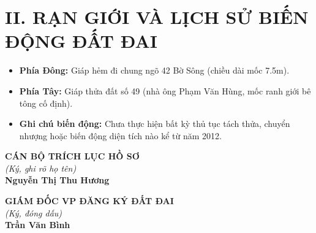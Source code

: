 \documentclass[12pt,a4paper]{article}
\begin{document}
\section*{II. RẠN GIỚI VÀ LỊCH SỬ BIẾN ĐỘNG ĐẤT ĐAI}
\begin{itemize}[leftmargin=1.5cm]
    \item \textbf{Phía Đông:} Giáp hẻm đi chung ngõ 42 Bờ Sông (chiều dài mốc 7.5m).
    \item \textbf{Phía Tây:} Giáp thửa đất số 49 (nhà ông Phạm Văn Hùng, mốc ranh giới bê tông cố định).
    \item \textbf{Ghi chú biến động:} Chưa thực hiện bất kỳ thủ tục tách thửa, chuyển nhượng hoặc biến động diện tích nào kể từ năm 2012.
\end{itemize}

\vspace{0.8cm}

\noindent
\begin{minipage}[t]{0.45\textwidth}
    \begin{center}
        \small
        \textbf{CÁN BỘ TRÍCH LỤC HỒ SƠ}\\
        \textit{(Ký, ghi rõ họ tên)}\\[1.5cm]
        \textbf{Nguyễn Thị Thu Hương}
    \end{center}
\end{minipage}
\hfill
\begin{minipage}[t]{0.5\textwidth}
    \begin{center}
        \small
        \textbf{GIÁM ĐỐC VP ĐĂNG KÝ ĐẤT ĐAI}\\
        \textit{(Ký, đóng dấu)}\\[1.5cm]
        \textbf{Trần Văn Bình}
    \end{center}
\end{minipage}
\end{document}
